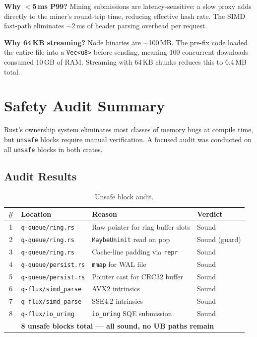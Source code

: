 \documentclass[a4paper, 11pt]{article}
\begin{document}
\textbf{Why $<$5\,ms P99?}  Mining submissions are latency-sensitive:
a slow proxy adds directly to the miner's round-trip time, reducing
effective hash rate.  The SIMD fast-path eliminates $\sim$2\,ms of
header parsing overhead per request.

\textbf{Why 64\,KB streaming?}  Node binaries are $\sim$100\,MB.
The pre-fix code loaded the entire file into a \texttt{Vec<u8>}
before sending, meaning 100 concurrent downloads consumed 10\,GB
of RAM.  Streaming with 64\,KB chunks reduces this to 6.4\,MB total.


\section{Safety Audit Summary}

Rust's ownership system eliminates most classes of memory bugs at
compile time, but \texttt{unsafe} blocks require manual verification.
A focused audit was conducted on all \texttt{unsafe} blocks in both
crates.

\subsection{Audit Results}

\begin{table}[H]
\centering
\caption{Unsafe block audit.}
\label{tab:unsafe}
\begin{tabular}{@{}clll@{}}
\toprule
\textbf{\#} & \textbf{Location} & \textbf{Reason} & \textbf{Verdict} \\
\midrule
1 & \texttt{q-queue/ring.rs}     & Raw pointer for ring buffer slots     & Sound \\
2 & \texttt{q-queue/ring.rs}     & \texttt{MaybeUninit} read on pop      & Sound (guard) \\
3 & \texttt{q-queue/ring.rs}     & Cache-line padding via \texttt{repr}  & Sound \\
4 & \texttt{q-queue/persist.rs}  & \texttt{mmap} for WAL file            & Sound \\
5 & \texttt{q-queue/persist.rs}  & Pointer cast for CRC32 buffer         & Sound \\
6 & \texttt{q-flux/simd\_parse}  & AVX2 intrinsics                       & Sound \\
7 & \texttt{q-flux/simd\_parse}  & SSE4.2 intrinsics                     & Sound \\
8 & \texttt{q-flux/io\_uring}    & \texttt{io\_uring} SQE submission     & Sound \\
\midrule
  & \multicolumn{3}{l}{\textbf{8 unsafe blocks total --- all sound, no UB paths remain}} \\
\bottomrule
\end{tabular}
\end{table}
\end{document}
